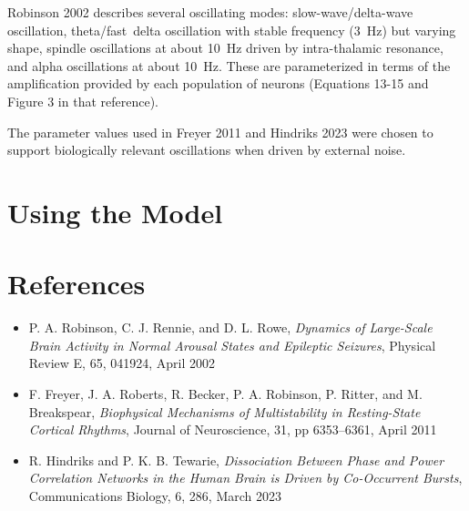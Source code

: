 Robinson 2002 describes several oscillating modes: slow-wave/delta-wave
oscillation, theta/fast~delta oscillation with stable frequency (3~Hz) but
varying shape, spindle oscillations at about 10~Hz driven by intra-thalamic
resonance, and alpha oscillations at about 10~Hz. These are parameterized
in terms of the amplification provided by each population of neurons
(Equations 13-15 and Figure 3 in that reference).

The parameter values used in Freyer 2011 and Hindriks 2023 were chosen to
support biologically relevant oscillations when driven by external noise.

%
%
\section{Using the Model}
\label{sect-robinson-howto}




%
%
\section{References}
\label{sect-robinson-refs}

\begin{itemize}
%
\item P. A. Robinson, C. J. Rennie, and D. L. Rowe, \textit{Dynamics of
Large-Scale Brain Activity in Normal Arousal States and Epileptic Seizures},
Physical Review E, 65, 041924, April 2002
%
\item F. Freyer, J. A. Roberts, R. Becker, P. A. Robinson, P. Ritter, and
M. Breakspear, \textit{Biophysical Mechanisms of Multistability in
Resting-State Cortical Rhythms}, Journal of Neuroscience, 31,
pp 6353--6361, April 2011
%
\item R. Hindriks and P. K. B. Tewarie, \textit{Dissociation Between Phase
and Power Correlation Networks in the Human Brain is Driven by Co-Occurrent
Bursts}, Communications Biology, 6, 286, March 2023
%
\end{itemize}

%
%
